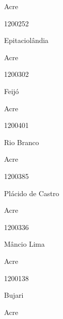 \documentclass[
  letterpaper,
]{report}
\begin{document}
\n    

\n    

\n      

Acre

\n      

1200252

\n      

Epitaciolândia

\n    

\n    

\n      

Acre

\n      

1200302

\n      

Feijó

\n    

\n    

\n      

Acre

\n      

1200401

\n      

Rio Branco

\n    

\n    

\n      

Acre

\n      

1200385

\n      

Plácido de Castro

\n    

\n    

\n      

Acre

\n      

1200336

\n      

Mâncio Lima

\n    

\n    

\n      

Acre

\n      

1200138

\n      

Bujari

\n    

\n    

\n      

Acre

\n      
\end{document}
